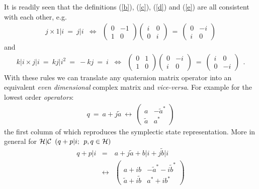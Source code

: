 It is readily seen that the definitions (\ref{b}), (\ref{c}), (\ref{d}) and
(\ref{e}) are all consistent with each other, e.g.
\begin{eqnarray*}
j \times 1\vert i \: = \: j\vert i & \Leftrightarrow & \left( \begin{array}{cc}
 0 & -1 \\ 1 & 0\end{array} \right)  \left( \begin{array}{cc} i & 0 \\
0 & i\end{array} \right) \: = \: \left( \begin{array}{cc} 0 & -i\\
i & 0\end{array} \right)
\end{eqnarray*}
and
\begin{eqnarray*}
k\vert i \times j\vert i \: = \: kj\vert i^{2} \: = \: -kj
\: = \: i & \Leftrightarrow & \left( \begin{array}{cc} 0 & 1 \\
1 & 0\end{array} \right)  \left( \begin{array}{cc} 0 & -i \\
i & 0\end{array} \right) \: = \: \left( \begin{array}{cc} i & 0\\
0 & -i\end{array} \right) \: \: .
\end{eqnarray*}
With these rules we can translate any quaternion matrix operator into an
equivalent {\em even dimensional} complex matrix and {\em vice-versa}. For
example for the lowest order {\em operators}:
\begin{eqnarray}
q \: = \: a + j\tilde{a} \: \leftrightarrow \: \left( \begin{array}{cc}
a & -\tilde{a}^{*}\\
\tilde{a} & a^{*}\end{array} \right)
\end{eqnarray}
the first column of which reproduces the symplectic state representation.
More in general for
\( {\cal H}\vert {\cal C} \; \: ( q + p\vert i; \: \: p,q \in {\cal H} ) \)
\begin{eqnarray}
q + p\vert i & = & a+j\tilde{a} + b\vert i+j\tilde{b} \vert i \nonumber \\
 & \leftrightarrow & \left( \begin{array}{cc}
a+ib & -\tilde{a}^{*}-i\tilde{b}^{*}\\
\tilde{a}+i\tilde{b} & a^{*}+ib^{*}\end{array} \right)
\end{eqnarray}
